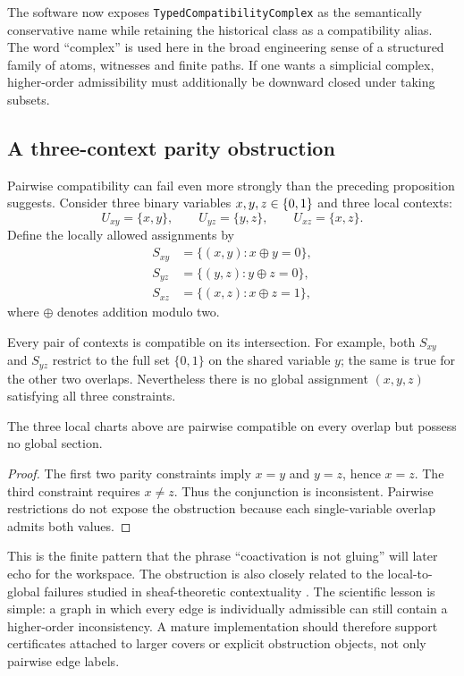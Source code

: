 The software now exposes \texttt{TypedCompatibilityComplex} as the semantically conservative name while retaining the historical class as a compatibility alias. The word ``complex'' is used here in the broad engineering sense of a structured family of atoms, witnesses and finite paths. If one wants a simplicial complex, higher-order admissibility must additionally be downward closed under taking subsets.

\subsection{A three-context parity obstruction}

Pairwise compatibility can fail even more strongly than the preceding proposition suggests. Consider three binary variables \(x,y,z\in\{0,1\}\) and three local contexts:
\[
U_{xy}=\{x,y\},\qquad U_{yz}=\{y,z\},\qquad U_{xz}=\{x,z\}.
\]
Define the locally allowed assignments by
\[
\begin{aligned}
S_{xy}&=\{(x,y):x\oplus y=0\},\\
S_{yz}&=\{(y,z):y\oplus z=0\},\\
S_{xz}&=\{(x,z):x\oplus z=1\},
\end{aligned}
\]
where \(\oplus\) denotes addition modulo two.

Every pair of contexts is compatible on its intersection. For example, both \(S_{xy}\) and \(S_{yz}\) restrict to the full set \(\{0,1\}\) on the shared variable \(y\); the same is true for the other two overlaps. Nevertheless there is no global assignment \((x,y,z)\) satisfying all three constraints.

\begin{proposition}
The three local charts above are pairwise compatible on every overlap but possess no global section.
\end{proposition}

\begin{proof}
The first two parity constraints imply \(x=y\) and \(y=z\), hence \(x=z\). The third constraint requires \(x\ne z\). Thus the conjunction is inconsistent. Pairwise restrictions do not expose the obstruction because each single-variable overlap admits both values.
\end{proof}

This is the finite pattern that the phrase ``coactivation is not gluing'' will later echo for the workspace. The obstruction is also closely related to the local-to-global failures studied in sheaf-theoretic contextuality \cite{abramsky2011}. The scientific lesson is simple: a graph in which every edge is individually admissible can still contain a higher-order inconsistency. A mature implementation should therefore support certificates attached to larger covers or explicit obstruction objects, not only pairwise edge labels.

